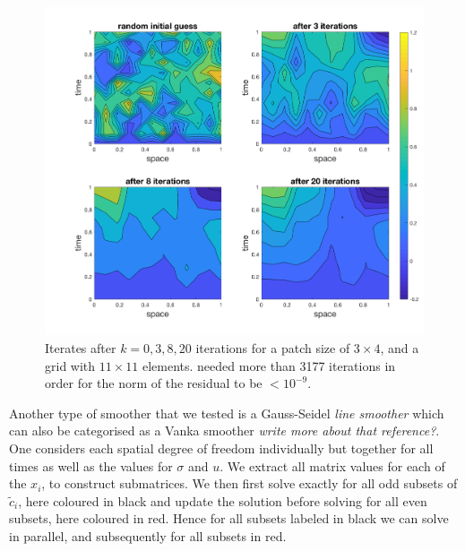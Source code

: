 \documentclass[../draft_1.tex]{subfiles}
\begin{document}
\begin{figure}[ht!]
	\centering
	\includegraphics[scale=0.28]{images/implementation/contour_plot_1_blk_size3by4}
	\caption{Iterates after $k = 0,3,8, 20$ iterations for a patch size of $3 \times 4$, and a grid with $11 \times 11$ elements. needed more than 3177 iterations in order for the norm of the residual to be $< 10^{-9}$.}
\end{figure}

Another type of smoother that we tested is a Gauss-Seidel \textit{line smoother} \cite{adams2001distributed} which can also be categorised as a Vanka smoother  \textit{write more about that reference?}. One considers each spatial degree of freedom individually but together for all times as well as the values for $\sigma$ and $u$. We extract all matrix values for each of the $x_i$, to construct submatrices. We then first solve exactly for all odd subsets of $\tilde{c}_i$, here coloured in black and update the solution before solving for all even subsets, here coloured in red. Hence for all subsets labeled in black we can solve in parallel, and subsequently for all subsets in red. 
\end{document}
